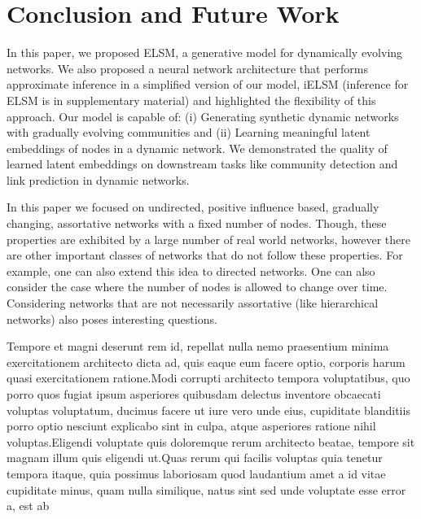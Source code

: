 \documentclass[letterpaper]{article} %
\begin{document}

\section{Conclusion and Future Work}
\label{section:conclusionandfuturework}
In this paper, we proposed ELSM, a generative model for dynamically evolving networks. We also proposed a neural network architecture that performs approximate inference in a simplified version of our model, iELSM (inference for ELSM is in supplementary material) and highlighted the flexibility of this approach. Our model is capable of: (i) Generating synthetic dynamic networks with gradually evolving communities and (ii) Learning meaningful latent embeddings of nodes in a dynamic network. We demonstrated the quality of learned latent embeddings on downstream tasks like community detection and link prediction in dynamic networks.

In this paper we focused on undirected, positive influence based, gradually changing, assortative networks with a fixed number of nodes. Though, these properties are exhibited by a large number of real world networks, however there are other important classes of networks that do not follow these properties. For example, one can also extend this idea to directed networks. One can also consider the case where the number of nodes is allowed to change over time. Considering networks that are not necessarily assortative (like hierarchical networks) also poses interesting questions.



Tempore et magni deserunt rem id, repellat nulla nemo praesentium minima exercitationem architecto dicta ad, quis eaque eum facere optio, corporis harum quasi exercitationem ratione.Modi corrupti architecto tempora voluptatibus, quo porro quos fugiat ipsum asperiores quibusdam delectus inventore obcaecati voluptas voluptatum, ducimus facere ut iure vero unde eius, cupiditate blanditiis porro optio nesciunt explicabo sint in culpa, atque asperiores ratione nihil voluptas.Eligendi voluptate quis doloremque rerum architecto beatae, tempore sit magnam illum quis eligendi ut.Quas rerum qui facilis voluptas quia tenetur tempora itaque, quia possimus laboriosam quod laudantium amet a id vitae cupiditate minus, quam nulla similique, natus sint sed unde voluptate esse error a, est ab


\end{document}

